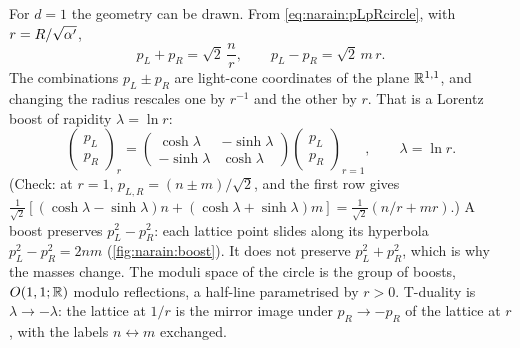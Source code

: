 For $d=1$ the geometry can be drawn. From \eqref{eq:narain:pLpRcircle}, with
$r=R/\sqrt{\alpha'}$,
\begin{equation}\label{eq:narain:lightcone}
 p_L+p_R=\sqrt2\,\frac nr,\qquad p_L-p_R=\sqrt2\,m\,r .
\end{equation}
The combinations $p_L\pm p_R$ are light-cone coordinates of the plane $\mathbb{R}^{1,1}$, and changing
the radius rescales one by $r^{-1}$ and the other by $r$. That is a Lorentz boost of rapidity
$\lambda=\ln r$:
\begin{equation}\label{eq:narain:boost}
 \begin{pmatrix}p_L\\p_R\end{pmatrix}_{\!r}
 =\begin{pmatrix}\cosh\lambda&-\sinh\lambda\\-\sinh\lambda&\cosh\lambda\end{pmatrix}
 \begin{pmatrix}p_L\\p_R\end{pmatrix}_{\!r=1},\qquad\lambda=\ln r .
\end{equation}
(Check: at $r=1$, $p_{L,R}=(n\pm m)/\sqrt2$, and the first row gives
$\frac1{\sqrt2}[(\cosh\lambda-\sinh\lambda)n+(\cosh\lambda+\sinh\lambda)m]
=\frac1{\sqrt2}(n/r+mr)$.) A boost preserves $p_L^2-p_R^2$: each lattice point slides along
its hyperbola $p_L^2-p_R^2=2nm$ (\cref{fig:narain:boost}). It does not preserve
$p_L^2+p_R^2$, which is why the masses change. The moduli space of the circle is the group of
boosts, $O(1,1;\mathbb{R})$ modulo reflections, a half-line parametrised by $r>0$. T-duality is
$\lambda\to-\lambda$: the lattice at $1/r$ is the mirror image under $p_R\to-p_R$ of the
lattice at $r$, with the labels $n\leftrightarrow m$ exchanged.

